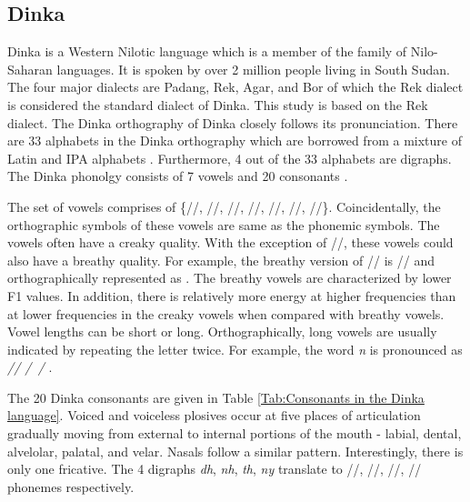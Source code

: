 \documentclass[a4paper]{article}
\begin{document}
\subsection{Dinka}  \vspace{-2mm}
Dinka is a Western Nilotic language which is a member of the family of Nilo-Saharan languages. It is spoken by over 2 million people living in South Sudan. The four major dialects are Padang, Rek, Agar, and Bor of which the Rek dialect is considered the standard dialect of Dinka. This study is based on the Rek dialect. The Dinka orthography of Dinka closely follows its pronunciation. There are 33 alphabets in the Dinka orthography which are borrowed from a mixture of Latin and IPA alphabets \cite{DinkaOmniglot}. Furthermore, 4 out of the 33 alphabets are digraphs. The Dinka phonolgy consists of 7 vowels and 20 consonants \cite{Remijsen-LuanyjangDinka}.

The set of vowels comprises of \{//, //, //, //, //, //, //\}. Coincidentally, the orthographic symbols of these vowels are same as the phonemic symbols. The vowels often have a creaky quality. With the exception of //, these vowels  could also have a breathy quality. For example, the breathy version of // is // and orthographically represented as . The breathy vowels are characterized by lower F1 values. In addition, there is relatively more energy at higher frequencies than at lower frequencies in the creaky vowels when compared with breathy vowels. Vowel lengths can be short or long. Orthographically, long vowels are usually indicated by repeating the letter twice. For example, the word \emph{n} is pronounced as \emph{// /~/} .

The 20 Dinka consonants are given in Table \ref{Tab:Consonants in the Dinka language}. Voiced and voiceless plosives occur at five places of articulation gradually moving from external to internal portions of the mouth - labial, dental, alvelolar, palatal, and velar. Nasals follow a similar pattern. Interestingly, there is only one fricative. The 4 digraphs \emph{dh}, \emph{nh}, \emph{th}, \emph{ny} translate to  /\textipa{\|[d}/, /\textipa{\|[n}/, /\textipa{\|[t}/, /\textltailn/ phonemes  respectively.
\end{document}
